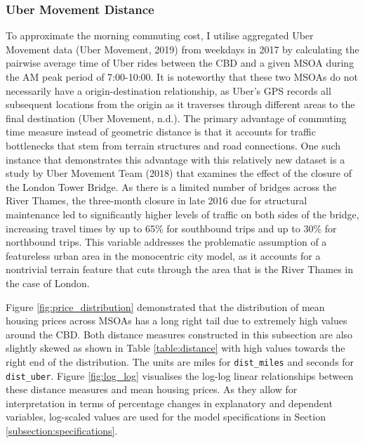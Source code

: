 \documentclass{article}
\begin{document}
\subsubsection{Uber Movement Distance}
To approximate the morning commuting cost, I utilise aggregated Uber Movement data (Uber Movement, 2019) from weekdays in 2017 by calculating the pairwise average time of Uber rides between the CBD and a given MSOA during the AM peak period of 7:00-10:00. It is noteworthy that these two MSOAs do not necessarily have a origin-destination relationship, as Uber's GPS records all subsequent locations from the origin as it traverses through different areas to the final destination (Uber Movement, n.d.). The primary advantage of commuting time measure instead of geometric distance is that it accounts for traffic bottlenecks that stem from terrain structures and road connections. One such instance that demonstrates this advantage with this relatively new dataset is a study by Uber Movement Team (2018) that examines the effect of the closure of the London Tower Bridge. As there is a limited number of bridges across the River Thames, the three-month closure in late 2016 due for structural maintenance led to significantly higher levels of traffic on both sides of the bridge, increasing travel times by up to 65\% for southbound trips and up to 30\% for northbound trips. This variable addresses the problematic assumption of a featureless urban area in the monocentric city model, as it accounts for a nontrivial terrain feature that cuts through the area that is the River Thames in the case of London. 

Figure \ref{fig:price_distribution} demonstrated that the distribution of mean housing prices across MSOAs has a long right tail due to extremely high values around the CBD. Both distance measures constructed in this subsection are also slightly skewed as shown in Table \ref{table:distance} with high values towards the right end of the distribution. The units are miles for \texttt{dist\_miles} and seconds for \texttt{dist\_uber}. Figure \ref{fig:log_log} visualises the log-log linear relationships between these distance measures and mean housing prices. As they allow for interpretation in terms of percentage changes in explanatory and dependent variables, log-scaled values are used for the model specifications in Section \ref{subsection:specifications}.
\end{document}
